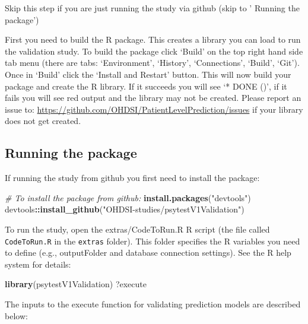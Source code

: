 \documentclass[
]{article}
\newenvironment{Shaded}{\begin{snugshade}}{\end{snugshade}}
\newcommand{\CommentTok}[1]{\textcolor[rgb]{0.56,0.35,0.01}{\textit{#1}}}
\newcommand{\KeywordTok}[1]{\textcolor[rgb]{0.13,0.29,0.53}{\textbf{#1}}}
\newcommand{\NormalTok}[1]{#1}
\newcommand{\OperatorTok}[1]{\textcolor[rgb]{0.81,0.36,0.00}{\textbf{#1}}}
\newcommand{\StringTok}[1]{\textcolor[rgb]{0.31,0.60,0.02}{#1}}
\begin{document}
Skip this step if you are just running the study via github (skip to '
Running the package')

First you need to build the R package. This creates a library you can
load to run the validation study. To build the package click `Build' on
the top right hand side tab menu (there are tabs: `Environment',
`History', `Connections', `Build', `Git'). Once in `Build' click the
`Install and Restart' button. This will now build your package and
create the R library. If it succeeds you will see `* DONE ()', if it
fails you will see red output and the library may not be created. Please
report an issue to:
\url{https://github.com/OHDSI/PatientLevelPrediction/issues} if your
library does not get created.

\hypertarget{running-the-package}{%
\subsection{Running the package}\label{running-the-package}}

If running the study from github you first need to install the package:

\begin{Shaded}
\begin{Highlighting}[]
\CommentTok{# To install the package from github:}
\KeywordTok{install.packages}\NormalTok{(}\StringTok{"devtools"}\NormalTok{)}
\NormalTok{devtools}\OperatorTok{::}\KeywordTok{install_github}\NormalTok{(}\StringTok{"OHDSI-studies/psytestV1Validation"}\NormalTok{)}
\end{Highlighting}
\end{Shaded}

To run the study, open the extras/CodeToRun.R R script (the file called
\texttt{CodeToRun.R} in the \texttt{extras} folder). This folder
specifies the R variables you need to define (e.g., outputFolder and
database connection settings). See the R help system for details:

\begin{Shaded}
\begin{Highlighting}[]
\KeywordTok{library}\NormalTok{(psytestV1Validation)}
\NormalTok{?execute}
\end{Highlighting}
\end{Shaded}

The inputs to the execute function for validating prediction models are
described below:
\end{document}
